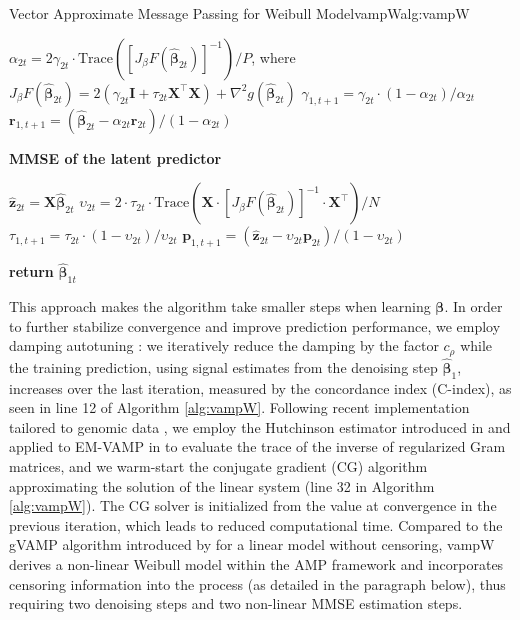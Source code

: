 \begin{breakablealgorithm}{Vector Approximate Message Passing for Weibull Model}{vampW}{alg:vampW}
\begin{algorithmic}[1]
        \STATE $\alpha_{2t} = 2 \gamma_{2t} \cdot \text{Trace}([J_{\beta}F(\hat{\bm{\beta}}_{2t})]^{-1})/P$, where $J_{\beta} F(\bm{\hat{\beta}}_{2t}) = 2(\gamma_{2t} \bm{I} + \tau_{2t}\bm{X}^\top\bm{X}) + \nabla^2 g(\hat{\bm{\beta}}_{2t})$ 
        \STATE $\gamma_{1,t+1} = \gamma_{2t} \cdot (1-\alpha_{2t}) / \alpha_{2t}$
        \STATE $\bm{r}_{1,t+1} = (\hat{\bm{\beta}}_{2t} - \alpha_{2t} \bm{r}_{2t}) / (1-\alpha_{2t})$ 
            
        \item[]
        \STATE \textbf{MMSE of the latent predictor}

        \STATE $\hat{\bm{z}}_{2t} =  \boldsymbol{X} \hat{\bm{\beta}}_{2t}$ 
        \STATE $\upsilon_{2t} = 2 \cdot \tau_{2t} \cdot \text{Trace}(\bm{X} \cdot [J_{\beta}F(\hat{\bm{\beta}}_{2t})]^{-1} \cdot \bm{X}^\top)/ N$
        \STATE $\tau_{1,t+1} = \tau_{2t} \cdot (1 - \upsilon_{2t}) / \upsilon_{2t}$ 
        \STATE $\bm{p}_{1,t+1} = (\hat{\bm{z}}_{2t} - \upsilon_{2t} \bm{p}_{2t}) / (1 - \upsilon_{2t})$
    
    \ENDFOR
    \STATE \textbf{return} $\hat{\bm{\beta}}_{1t}$
    \end{algorithmic}
\end{breakablealgorithm}

This approach makes the algorithm take smaller steps when learning $\bm{\beta}$. In order to further stabilize convergence and improve prediction performance, we employ damping autotuning \cite{VAMP_MRI,sarkar2021mri}: we iteratively reduce the damping by the factor $c_{\rho}$ while the training prediction, using signal estimates from the denoising step $\hat{\bm{\beta}}_1$, increases over the last iteration, measured by the concordance index (C-index), as seen in line 12 of Algorithm \ref{alg:vampW}. Following recent implementation tailored to genomic data \cite{Depope2026}, we employ the Hutchinson estimator introduced in \cite{Hutchinson} and applied to EM-VAMP in \cite{schniter2021gampmatlab} to evaluate the trace of the inverse of regularized Gram matrices, and we warm-start the conjugate gradient (CG) algorithm approximating the solution of the linear system (line 32 in Algorithm \ref{alg:vampW}). The CG solver %
is initialized from the value at convergence in the previous iteration, which leads to reduced computational time. Compared to the gVAMP algorithm introduced by \cite{Depope2026} for a linear model without censoring, vampW derives a non-linear Weibull model within the AMP framework and incorporates censoring information into the process (as detailed in the paragraph below), thus requiring two denoising steps and two non-linear MMSE estimation steps.

